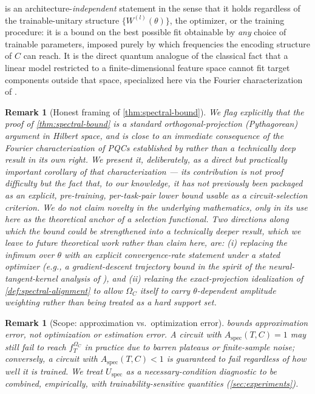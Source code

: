 \documentclass[11pt]{article}
\newtheorem{remark}[theorem]{Remark}
\newcommand{\Aspec}{A_{\mathrm{spec}}}
\newcommand{\fT}{f_T}
\newcommand{\Omc}{\Omega_C}
\begin{document}
 is an architecture-\emph{independent} statement in the sense that it holds regardless of the trainable-unitary structure $\{W^{(l)}(\theta)\}$, the optimizer, or the training procedure: it is a bound on the best possible fit obtainable by \emph{any} choice of trainable parameters, imposed purely by which frequencies the encoding structure of $C$ can reach. It is the direct quantum analogue of the classical fact that a linear model restricted to a finite-dimensional feature space cannot fit target components outside that space, specialized here via the Fourier characterization of \citet{schuld2021effect}.

\begin{remark}[Honest framing of \cref{thm:spectral-bound}]
\label{rem:theorem-framing}
We flag explicitly that the proof of \cref{thm:spectral-bound} is a standard orthogonal-projection (Pythagorean) argument in Hilbert space, and is close to an immediate consequence of the Fourier characterization of PQCs established by \citet{schuld2021effect} rather than a technically deep result in its own right. We present it, deliberately, as a \emph{direct but practically important corollary} of that characterization --- its contribution is not proof difficulty but the fact that, to our knowledge, it has not previously been packaged as an explicit, pre-training, per-task-pair lower bound usable as a circuit-selection criterion. We do not claim novelty in the underlying mathematics, only in its use here as the theoretical anchor of a selection functional. Two directions along which the bound could be strengthened into a technically deeper result, which we leave to future theoretical work rather than claim here, are: (i) replacing the infimum over $\theta$ with an explicit convergence-rate statement under a stated optimizer (e.g., a gradient-descent trajectory bound in the spirit of the neural-tangent-kernel analysis of \citet{jacot2018neural}), and (ii) relaxing the exact-projection idealization of \cref{def:spectral-alignment} to allow $\Omc$ itself to carry $\theta$-dependent amplitude weighting rather than being treated as a hard support set.
\end{remark}

\begin{remark}[Scope: approximation vs.\ optimization error]
 bounds \emph{approximation} error, not \emph{optimization} or \emph{estimation} error. A circuit with $\Aspec(T,C)=1$ may still fail to reach $\fT^{\Omc}$ in practice due to barren plateaus \citep{mcclean2018barren} or finite-sample noise; conversely, a circuit with $\Aspec(T,C) < 1$ is guaranteed to fail regardless of how well it is trained. We treat $U_{\mathrm{spec}}$ as a necessary-condition diagnostic to be combined, empirically, with trainability-sensitive quantities (\cref{sec:experiments}).
\end{remark}
\end{document}

